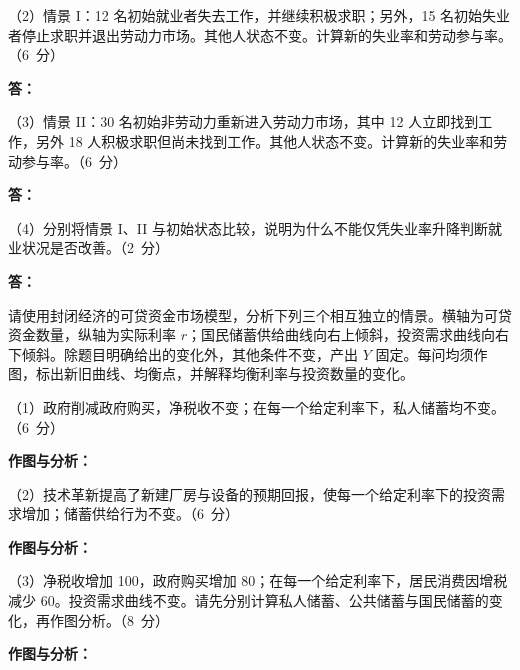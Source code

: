 \documentclass[UTF8,11pt,a4paper,fontset=fandol]{ctexart}
\newcommand{\sect}[1]{\par\vspace{0.7em}{\large\bfseries #1}\par\vspace{0.6em}}
\begin{document}
（2）情景 I：12 名初始就业者失去工作，并继续积极求职；另外，15 名初始失业者停止求职并退出劳动力市场。其他人状态不变。计算新的失业率和劳动参与率。\hfill\mbox{（6 分）}
\par\vspace{0.4em}\textbf{答：}\par\vfill

（3）情景 II：30 名初始非劳动力重新进入劳动力市场，其中 12 人立即找到工作，另外 18 人积极求职但尚未找到工作。其他人状态不变。计算新的失业率和劳动参与率。\hfill\mbox{（6 分）}
\par\vspace{0.4em}\textbf{答：}\par\vfill

（4）分别将情景 I、II 与初始状态比较，说明为什么不能仅凭失业率升降判断就业状况是否改善。\hfill\mbox{（2 分）}
\par\vspace{0.4em}\textbf{答：}\par\vfill
\newpage\sect{四、作图分析题（1 题，共 20 分）}
请使用封闭经济的可贷资金市场模型，分析下列三个相互独立的情景。横轴为可贷资金数量，纵轴为实际利率 $r$；国民储蓄供给曲线向右上倾斜，投资需求曲线向右下倾斜。除题目明确给出的变化外，其他条件不变，产出 $Y$ 固定。每问均须作图，标出新旧曲线、均衡点，并解释均衡利率与投资数量的变化。

（1）政府削减政府购买，净税收不变；在每一个给定利率下，私人储蓄均不变。\hfill\mbox{（6 分）}
\par\vspace{0.5em}\textbf{作图与分析：}\par\vfill

（2）技术革新提高了新建厂房与设备的预期回报，使每一个给定利率下的投资需求增加；储蓄供给行为不变。\hfill\mbox{（6 分）}
\par\vspace{0.5em}\textbf{作图与分析：}\par\vfill

（3）净税收增加 100，政府购买增加 80；在每一个给定利率下，居民消费因增税减少 60。投资需求曲线不变。请先分别计算私人储蓄、公共储蓄与国民储蓄的变化，再作图分析。\hfill\mbox{（8 分）}
\par\vspace{0.5em}\textbf{作图与分析：}\par\vfill
\end{document}
